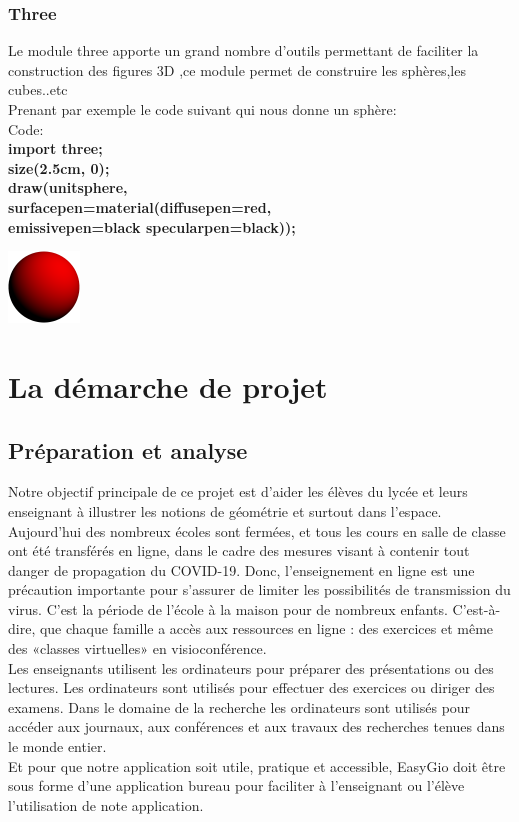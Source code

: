 \documentclass[a4paper]{report}
\begin{document}
\subsubsection{Three}
Le module three apporte un grand nombre d’outils permettant de faciliter la construction des figures 3D ,ce module permet de construire les sphères,les cubes..etc\\
Prenant par exemple le code suivant qui nous donne un sphère:\\
Code:\\
\textbf{import three;\\
size(2.5cm, 0);\\
draw(unitsphere,\\
surfacepen=material(diffusepen=red,\\
emissivepen=black specularpen=black));}\\
\begin{center}
    \includegraphics{images/Des6.png}
\end{center}
\newpage
\section{La démarche de projet}
\subsection{Préparation et analyse}
Notre objectif principale de ce projet est d'aider les élèves du lycée et leurs enseignant à illustrer les notions de géométrie et surtout dans l'espace.\\
Aujourd'hui des nombreux écoles sont fermées, et tous les cours en salle de classe ont été transférés en ligne, dans le cadre des mesures visant à contenir tout danger de propagation du COVID-19. Donc, l’enseignement en ligne est une précaution importante pour s’assurer de limiter les possibilités de transmission du virus. C’est la période de l’école à la maison pour de nombreux enfants. C’est-à-dire, que chaque famille a accès aux ressources en ligne : des exercices et même des «classes virtuelles» en visioconférence.\\
Les enseignants utilisent les ordinateurs pour préparer des présentations ou des lectures. Les ordinateurs sont utilisés pour effectuer des exercices ou diriger des examens. Dans le domaine de la recherche les ordinateurs sont utilisés pour accéder aux journaux, aux conférences et aux travaux des recherches tenues dans le monde entier.\\
Et pour que notre application soit utile, pratique et accessible, EasyGio doit être sous forme d'une application bureau pour faciliter à l'enseignant ou l'élève l'utilisation de note application. 
\end{document}
